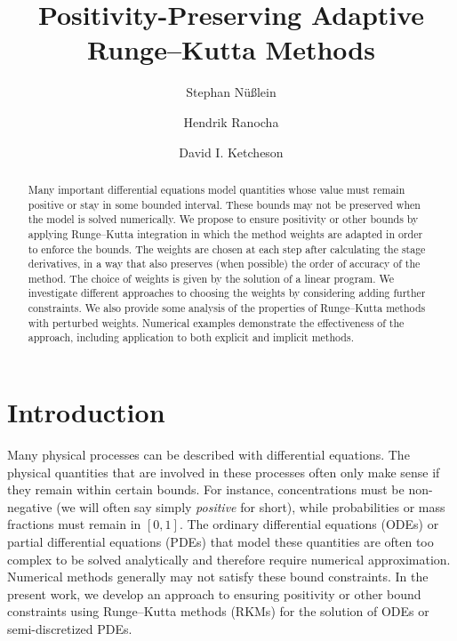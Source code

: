 \documentclass[a4paper]{article}
\title{Positivity-Preserving Adaptive Runge--Kutta Methods}
\author{Stephan Nüßlein \and Hendrik Ranocha \and David I. Ketcheson}
\numberwithin{equation}{section}
\theoremstyle{plain}
\theoremstyle{definition}
\numberwithin{theorem}{section}
\newcommand{\1}{\mathbbm{1}}
\begin{document}
\maketitle

\begin{abstract}
Many important differential equations model quantities whose value
must remain positive or stay in some bounded interval.
These bounds may not be preserved when the model is solved numerically.
We propose to ensure positivity or other bounds by applying Runge--Kutta
integration in which the method weights are adapted in order to
enforce the bounds.  The weights are chosen at each step after calculating the
stage derivatives, in a way that also preserves (when possible) the order of
accuracy of the method.  The choice of weights is given by the solution
of a linear program.
We investigate different approaches to choosing the weights by considering
adding further constraints.
We also provide some analysis of the properties
of Runge--Kutta methods with perturbed weights.  Numerical examples demonstrate
the effectiveness of the approach, including application to both explicit and
implicit methods.
\end{abstract}



\section{Introduction}


Many physical processes can be described with differential equations. 
The physical quantities that are involved in these processes often only make sense if they remain within certain bounds.
For instance, concentrations must be non-negative (we will often say simply {\em positive} for short), while
probabilities or mass fractions must remain in $[0,1]$.
The ordinary differential equations (ODEs) or partial differential equations
(PDEs) that model these quantities are often too complex to be solved
analytically and therefore require numerical approximation.
Numerical methods generally may not satisfy these bound constraints.
In the present work, we develop an approach to ensuring positivity
or other bound constraints using Runge--Kutta methods (RKMs) for the
solution of ODEs or semi-discretized PDEs.
\end{document}
